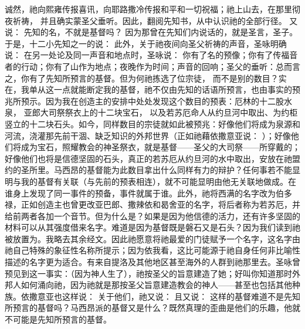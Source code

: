 诚然，祂向熙雍传报喜讯，向耶路撒冷传报和平和一切祝福；祂上山去，在那里彻夜祈祷， 并且确实蒙圣父垂听。因此，翻阅先知书，从中认识祂的全部行径。    又说： 先知的名，不就是基督吗？   因为那曾在先知们内说话的，就是圣言，圣子。 于是，十二小先知之一的说：  此外，关于祂夜间向圣父祈祷的声音，圣咏明确说： 在另一处论及同一声音和地点时，圣咏说： 你有了名的预像；你有了传福音者的行动；你有了山作为地点；夜晚作为时间；声音的回响；圣父的垂听：总而言之，你有了先知所预言的基督。但为何祂拣选了位宗徒， 而不是别的数目？实在，我单从这一点就能断定我的基督，祂不仅由先知的话语所预言，也由事实的预兆所预示。因为我在创造主的安排中处处发现这个数目的预表：厄林的十二股水泉， 亚郎大司祭祭衣上的十二块宝石， 以及若苏厄命人从约旦河中取出、为约柜竖立的十二块石头。如今，同样数目的宗徒就如此被预兆：好像他们将成为泉源和河流，浇灌那先前干涸、缺乏知识的外邦世界（正如祂藉依撒意亚说： ）；好像他们将成为宝石，照耀教会的神圣祭衣，就是基督——圣父的大司祭——所穿戴的；好像他们也将是信德坚固的石头，真正的若苏厄从约旦河的水中取出，安放在祂盟约的圣所里。马西昂的基督能为此数目拿出什么同样有力的辩护？任何事若不能显明与我的基督有关联（与先前的预表相连），就不可能显明由他无关联地做成。在谁身上发现了同一事件的预备，事件就属于谁。此外，祂将西满的名字改为伯多禄，正如创造主也曾更改亚巴郎、撒辣依和曷舍亚的名字，将后者称为若苏厄，并给前两者各加一个音节。但为什么是？如果是因为他信德的活力，还有许多坚固的材料可以从其强度借来名字。难道是因为基督既是磐石又是石头？因为我们读到祂被放置为。我略去其余经文。因此祂愿意将祂最爱的门徒赋予一个名字，这名字由祂自己特殊的象征性名称所提示；因为依我看，这比可能源于祂自身任何非比喻性描述的名字更为适合。有来自提洛及其他地区甚至海外的人群到祂那里去。圣咏曾预见到这一事实：（因为神人生了），祂按圣父的旨意建造了她；好叫你知道那时外邦人如何涌向祂，因为祂就是那按圣父旨意建造教会的神人——甚至也包括其他种族。依撒意亚也这样说：  关于他们，祂又说：  且又说：  这样的基督难道不是先知所预言的基督吗？马西昂派的基督又是什么？既然真理的歪曲是他们的乐趣，他就不可能是先知所预言的基督。\par

